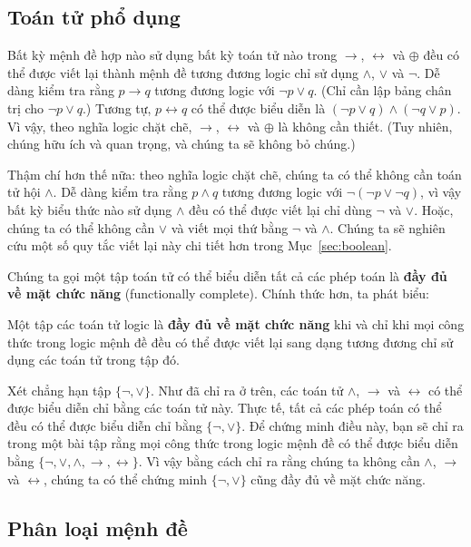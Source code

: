 \subsection{Toán tử phổ dụng}

Bất kỳ mệnh đề hợp nào sử dụng bất kỳ toán tử nào trong $\to$, $\leftrightarrow$ và $\oplus$ đều có thể được viết lại thành mệnh đề tương đương logic chỉ sử dụng $\land$, $\lor$ và $\lnot$. Dễ dàng kiểm tra rằng $p \to q$ tương đương logic với $\lnot p \lor q$. (Chỉ cần lập bảng chân trị cho $\lnot p \lor q$.) Tương tự, $p \leftrightarrow q$ có thể được biểu diễn là $(\lnot p \lor q) \land (\lnot q \lor p)$. Vì vậy, theo nghĩa logic chặt chẽ, $\to$, $\leftrightarrow$ và $\oplus$ là không cần thiết. (Tuy nhiên, chúng hữu ích và quan trọng, và chúng ta sẽ không bỏ chúng.)

Thậm chí hơn thế nữa: theo nghĩa logic chặt chẽ, chúng ta có thể không cần toán tử hội $\land$. Dễ dàng kiểm tra rằng $p \land q$ tương đương logic với $\lnot(\lnot p \lor \lnot q)$, vì vậy bất kỳ biểu thức nào sử dụng $\land$ đều có thể được viết lại chỉ dùng $\lnot$ và $\lor$. Hoặc, chúng ta có thể không cần $\lor$ và viết mọi thứ bằng $\lnot$ và $\land$. Chúng ta sẽ nghiên cứu một số quy tắc viết lại này chi tiết hơn trong Mục~\ref{sec:boolean}.

Chúng ta gọi một tập toán tử có thể biểu diễn tất cả các phép toán là \textbf{đầy đủ về mặt chức năng} (functionally complete). Chính thức hơn, ta phát biểu:

\begin{definition}
Một tập các toán tử logic là \textbf{đầy đủ về mặt chức năng} khi và chỉ khi mọi công thức trong logic mệnh đề đều có thể được viết lại sang dạng tương đương chỉ sử dụng các toán tử trong tập đó.
\end{definition}

Xét chẳng hạn tập $\{\lnot, \lor\}$. Như đã chỉ ra ở trên, các toán tử $\land$, $\to$ và $\leftrightarrow$ có thể được biểu diễn chỉ bằng các toán tử này. Thực tế, tất cả các phép toán có thể đều có thể được biểu diễn chỉ bằng $\{\lnot, \lor\}$. Để chứng minh điều này, bạn sẽ chỉ ra trong một bài tập rằng mọi công thức trong logic mệnh đề có thể được biểu diễn bằng $\{\lnot, \lor, \land, \to, \leftrightarrow\}$. Vì vậy bằng cách chỉ ra rằng chúng ta không cần $\land$, $\to$ và $\leftrightarrow$, chúng ta có thể chứng minh $\{\lnot, \lor\}$ cũng đầy đủ về mặt chức năng.

\subsection{Phân loại mệnh đề}

